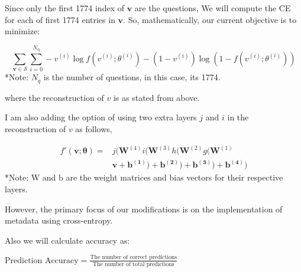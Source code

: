 \documentclass{article}
\begin{document}
\begin{enumerate}
\begin{enumerate}
     Since only the first 1774 index of $\mathbf{v}$ are the questions, We will compute the CE for each of first 1774 entries in $\mathbf{v}$. So, mathematically, our current objective is to minimize:
      \begin{tcolorbox}[colback=gray!5!white,colframe=gray!75!black]
     $$\sum_{\mathbf{v} \in \mathcal{S}}\sum_{i=0}^{N_{\text{q}}} -{v}^{(i)}\log f({v^{(i)};}{\theta^{(i)}}) - (1-{v}^{(i)})\log(1 - f({v^{(i)};}\theta^{(i)}))$$
      *Note: $N_q$ is the number of questions, in this case, its 1774. 
     \end{tcolorbox}
     where the reconstruction of $v$ is as stated from above. 
     
     I am also adding the option of using two extra layers $j$ and $i$ in the reconstruction of $v$ as follows, \begin{tcolorbox}
     \begin{align*}
         f'(\mathbf{v};\bm{\theta})=&j(\mathbf{W}^{(4)}i(\mathbf{W}^{(3)}h(\mathbf{W}^{(2)}g(\mathbf{W}^{(1)}\\ &\mathbf{v+b^{(1)})+b^{(2)})+b^{(3)})+b^{(4)}}) 
    \end{align*}
    *Note: W and b are the weight matrices and bias vectors for their respective layers.
    \end{tcolorbox}

    However, the primary focus of our modifications is on the implementation of metadata using cross-entropy.

     Also we will calculate accuracy as:
      \begin{tcolorbox}[colback=gray!5!white,colframe=gray!75!black]
       $\text{Prediction Accuracy} = \frac{\text{The number of correct predictions}}{\text{The number of total predictions}}$
     \end{tcolorbox}
    

\end{enumerate}
\end{enumerate}
\end{document}
